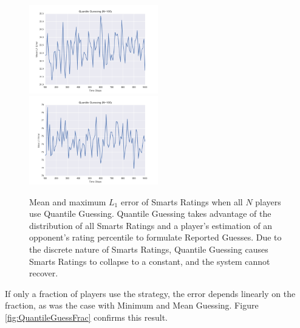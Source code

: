 \begin{figure}[h]
\centerline{%
\includegraphics[width=0.5\textwidth]{figures/robustness/Quantile_Guessing21.png}%
\includegraphics[width=0.5\textwidth] {figures/robustness/Quantile_Guessing22.png}%
}%
\caption{Mean and maximum $L_1$ error of Smarts Ratings when all $N$ players use Quantile Guessing. Quantile Guessing takes advantage of the distribution of all Smarts Ratings and a player's estimation of an opponent's rating percentile to formulate Reported Guesses. Due to the discrete nature of Smarts Ratings, Quantile Guessing causes Smarts Ratings to collapse to a constant, and the system cannot recover.}
\label{fig:QuantileGuess}
\end{figure}

If only a fraction of players use the strategy, the error depends linearly on the fraction, as was the case with Minimum and Mean Guessing. Figure \ref{fig:QuantileGuessFrac} confirms this result.

